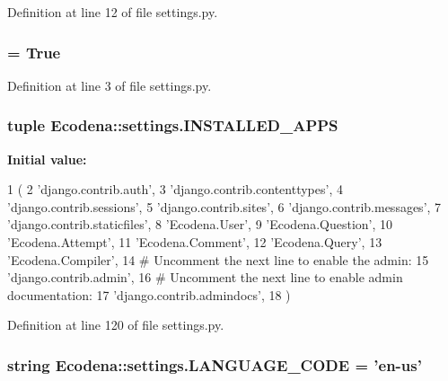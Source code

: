 Definition at line 12 of file settings.py.

\hypertarget{namespace_ecodena_1_1settings_ac21c37d412e76b31f8d23bcbec22a154}{
\subsubsection[{DEBUG}]{ = True}}
\label{d1/d62/namespace_ecodena_1_1settings_ac21c37d412e76b31f8d23bcbec22a154}


Definition at line 3 of file settings.py.

\hypertarget{namespace_ecodena_1_1settings_ac8fdbd1ee538838abd943b2a5ca6dda0}{
\subsubsection[{INSTALLED\_\-APPS}]{\setlength{\rightskip}{0pt plus 5cm}tuple {\bf Ecodena::settings.INSTALLED\_\-APPS}}}
\label{d1/d62/namespace_ecodena_1_1settings_ac8fdbd1ee538838abd943b2a5ca6dda0}
{\bfseries Initial value:}
\begin{DoxyCode}
1 (
2     'django.contrib.auth',
3     'django.contrib.contenttypes',
4     'django.contrib.sessions',
5     'django.contrib.sites',
6     'django.contrib.messages',
7     'django.contrib.staticfiles',
8     'Ecodena.User',
9     'Ecodena.Question',
10     'Ecodena.Attempt',
11     'Ecodena.Comment',
12     'Ecodena.Query',
13     'Ecodena.Compiler',                 
14     # Uncomment the next line to enable the admin:
15     'django.contrib.admin',
16     # Uncomment the next line to enable admin documentation:
17     'django.contrib.admindocs',
18 )
\end{DoxyCode}


Definition at line 120 of file settings.py.

\hypertarget{namespace_ecodena_1_1settings_a5d9f8066c3a75d690966d8a0864c973d}{
\subsubsection[{LANGUAGE\_\-CODE}]{\setlength{\rightskip}{0pt plus 5cm}string {\bf Ecodena::settings.LANGUAGE\_\-CODE} = 'en-\/us'}}
\label{d1/d62/namespace_ecodena_1_1settings_a5d9f8066c3a75d690966d8a0864c973d}


